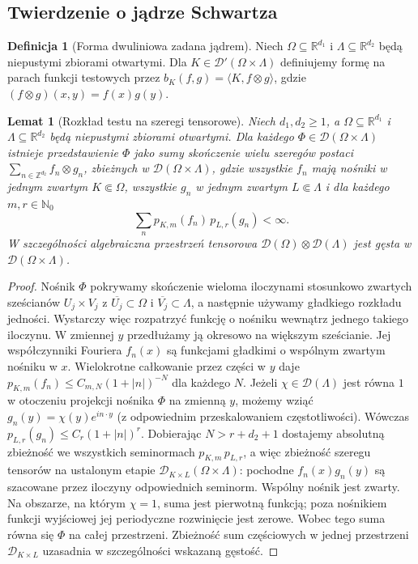\documentclass[11pt,a4paper]{article}
\numberwithin{equation}{section}
\theoremstyle{plain}
\newtheorem{lemat}[twierdzenie]{Lemat}
\theoremstyle{definition}
\newtheorem{definicja}[twierdzenie]{Definicja}
\theoremstyle{remark}
\newcommand{\R}{\mathbb R}
\newcommand{\N}{\mathbb N}
\begin{document}
\subsection{Twierdzenie o jądrze Schwartza}

\begin{definicja}[Forma dwuliniowa zadana jądrem]
\label{def:kernel-pair23}
Niech $\Omega\subseteq\R^{d_1}$ i
$\Lambda\subseteq\R^{d_2}$ będą niepustymi zbiorami otwartymi.
Dla $K\in\mathcal D'(\Omega\times\Lambda)$ definiujemy
formę na parach funkcji testowych przez
$b_K(f,g)=\langle K,f\otimes g\rangle$,
gdzie $(f\otimes g)(x,y)=f(x)g(y)$.
\end{definicja}

\begin{lemat}[Rozkład testu na szeregi tensorowe]
\label{lem:tensor-density23}
Niech $d_1,d_2\ge1$, a $\Omega\subseteq\R^{d_1}$ i
$\Lambda\subseteq\R^{d_2}$ będą niepustymi zbiorami otwartymi.
Dla każdego $\Phi\in\mathcal D(\Omega\times\Lambda)$
istnieje przedstawienie $\Phi$ jako sumy skończenie
wielu szeregów postaci
$\sum_{n\in\mathbb Z^{d_2}}f_n\otimes g_n$,
zbieżnych w $\mathcal D(\Omega\times\Lambda)$,
gdzie wszystkie $f_n$ mają nośniki w jednym zwartym
$K\Subset\Omega$, wszystkie $g_n$ w jednym zwartym
$L\Subset\Lambda$ i dla każdego $m,r\in\N_0$
\[
 \sum_n p_{K,m}(f_n)\,p_{L,r}(g_n)<\infty.
\]
W szczególności algebraiczna przestrzeń tensorowa
$\mathcal D(\Omega)\otimes\mathcal D(\Lambda)$
jest gęsta w $\mathcal D(\Omega\times\Lambda)$.
\end{lemat}
\begin{proof}
Nośnik $\Phi$ pokrywamy skończenie wieloma iloczynami
stosunkowo zwartych sześcianów $U_j\times V_j$
z $\overline{U_j}\subset\Omega$ i
$\overline{V_j}\subset\Lambda$, a następnie używamy
gładkiego rozkładu jedności. Wystarczy więc rozpatrzyć
funkcję o nośniku wewnątrz jednego takiego iloczynu.
W zmiennej $y$ przedłużamy ją okresowo na większym
sześcianie. Jej współczynniki Fouriera $f_n(x)$ są
funkcjami gładkimi o wspólnym zwartym nośniku w $x$.
Wielokrotne całkowanie przez części w $y$ daje
$p_{K,m}(f_n)\le C_{m,N}(1+|n|)^{-N}$ dla każdego $N$.
Jeżeli $\chi\in\mathcal D(\Lambda)$ jest równa $1$
w otoczeniu projekcji nośnika $\Phi$ na zmienną $y$,
możemy wziąć $g_n(y)=\chi(y)e^{in\cdot y}$
(z odpowiednim przeskalowaniem częstotliwości).
Wówczas $p_{L,r}(g_n)\le C_r(1+|n|)^r$.
Dobierając $N>r+d_2+1$ dostajemy absolutną zbieżność
we wszystkich seminormach $p_{K,m}\,p_{L,r}$, a więc
zbieżność szeregu tensorów na ustalonym etapie
$\mathcal D_{K\times L}(\Omega\times\Lambda)$:
pochodne $f_n(x)g_n(y)$ są szacowane przez iloczyny
odpowiednich seminorm. Wspólny nośnik jest zwarty.
Na obszarze, na którym $\chi=1$, suma jest pierwotną
funkcją; poza nośnikiem funkcji wyjściowej jej
periodyczne rozwinięcie jest zerowe. Wobec tego suma
równa się $\Phi$ na całej przestrzeni. Zbieżność
sum częściowych w jednej przestrzeni $\mathcal D_{K\times L}$
uzasadnia w szczególności wskazaną gęstość.
\end{proof}
\end{document}
